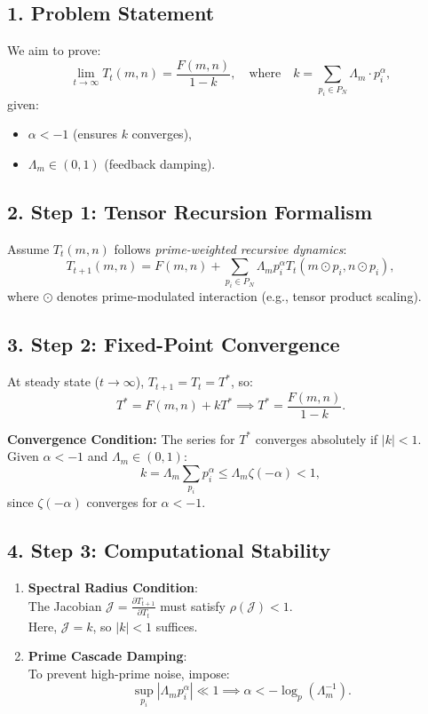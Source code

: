 \documentclass[12pt]{article}
\theoremstyle{plain}
\begin{document}
\subsection*{1. Problem Statement}

We aim to prove:
\[
\lim_{t \to \infty} T_t(m,n) = \frac{F(m,n)}{1 - k}, \quad \text{where} \quad k = \sum_{p_i \in P_N} \Lambda_m \cdot p_i^\alpha,
\]
given:
\begin{itemize}
    \item \( \alpha < -1 \) (ensures \( k \) converges),
    \item \( \Lambda_m \in (0,1) \) (feedback damping).
\end{itemize}

\subsection*{2. Step 1: Tensor Recursion Formalism}

Assume \( T_t(m,n) \) follows \emph{prime-weighted recursive dynamics}:
\[
T_{t+1}(m,n) = F(m,n) + \sum_{p_i \in P_N} \Lambda_m p_i^\alpha T_t(m \odot p_i, n \odot p_i),
\]
where \( \odot \) denotes prime-modulated interaction (e.g., tensor product scaling).

\subsection*{3. Step 2: Fixed-Point Convergence}

At steady state (\( t \to \infty \)), \( T_{t+1} = T_t = T^* \), so:
\[
T^* = F(m,n) + k T^* \implies T^* = \frac{F(m,n)}{1 - k}.
\]

\textbf{Convergence Condition:}  
The series for \( T^* \) converges absolutely if \( |k| < 1 \).  
Given \( \alpha < -1 \) and \( \Lambda_m \in (0,1) \):
\[
k = \Lambda_m \sum_{p_i} p_i^\alpha \leq \Lambda_m \zeta(-\alpha) < 1,
\]
since \( \zeta(-\alpha) \) converges for \( \alpha < -1 \).

\subsection*{4. Step 3: Computational Stability}

\begin{enumerate}
    \item \textbf{Spectral Radius Condition}:\\
    The Jacobian \( \mathcal{J} = \frac{\partial T_{t+1}}{\partial T_t} \) must satisfy \( \rho(\mathcal{J}) < 1 \).\\
    Here, \( \mathcal{J} = k \), so \( |k| < 1 \) suffices.

    \item \textbf{Prime Cascade Damping}:\\
    To prevent high-prime noise, impose:
    \[
    \sup_{p_i} \left| \Lambda_m p_i^\alpha \right| \ll 1 \implies \alpha < -\log_p (\Lambda_m^{-1}).
    \]
\end{enumerate}
\end{document}
